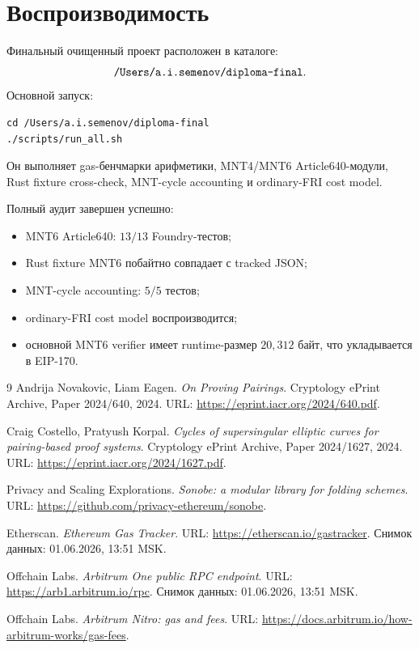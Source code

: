 \documentclass[12pt,a4paper]{article}
\newcommand{\code}[1]{\texttt{\detokenize{#1}}}
\begin{document}
\section{Воспроизводимость}

Финальный очищенный проект расположен в каталоге:
\[
    \code{/Users/a.i.semenov/diploma-final}.
\]
Основной запуск:
\begin{verbatim}
cd /Users/a.i.semenov/diploma-final
./scripts/run_all.sh
\end{verbatim}
Он выполняет gas-бенчмарки арифметики, MNT4/MNT6 Article640-модули, Rust
fixture cross-check, MNT-cycle accounting и ordinary-FRI cost model.

Полный аудит завершен успешно:
\begin{itemize}
    \item MNT6 Article640: $13/13$ Foundry-тестов;
    \item Rust fixture MNT6 побайтно совпадает с tracked JSON;
    \item MNT-cycle accounting: $5/5$ тестов;
    \item ordinary-FRI cost model воспроизводится;
    \item основной MNT6 verifier имеет runtime-размер $20{,}312$ байт, что
    укладывается в EIP-170.
\end{itemize}

\begin{thebibliography}{9}
Andrija Novakovic, Liam Eagen.
\emph{On Proving Pairings}.
Cryptology ePrint Archive, Paper 2024/640, 2024.
URL: \url{https://eprint.iacr.org/2024/640.pdf}.

Craig Costello, Pratyush Korpal.
\emph{Cycles of supersingular elliptic curves for pairing-based proof systems}.
Cryptology ePrint Archive, Paper 2024/1627, 2024.
URL: \url{https://eprint.iacr.org/2024/1627.pdf}.

Privacy and Scaling Explorations.
\emph{Sonobe: a modular library for folding schemes}.
URL: \url{https://github.com/privacy-ethereum/sonobe}.

Etherscan.
\emph{Ethereum Gas Tracker}.
URL: \url{https://etherscan.io/gastracker}.
Снимок данных: 01.06.2026, 13:51 MSK.

Offchain Labs.
\emph{Arbitrum One public RPC endpoint}.
URL: \url{https://arb1.arbitrum.io/rpc}.
Снимок данных: 01.06.2026, 13:51 MSK.

Offchain Labs.
\emph{Arbitrum Nitro: gas and fees}.
URL: \url{https://docs.arbitrum.io/how-arbitrum-works/gas-fees}.
\end{thebibliography}
\end{document}
